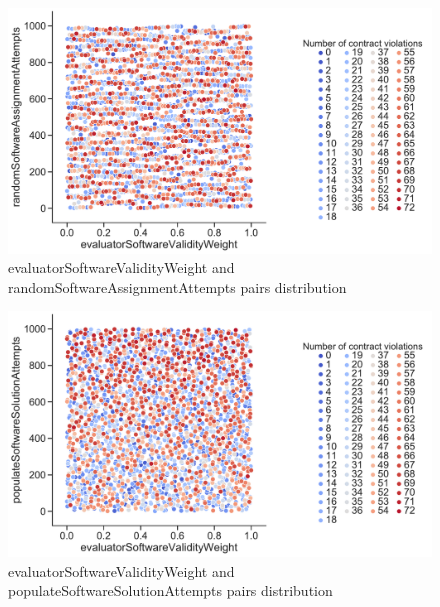\begin{figure}
	\centering
	\includegraphics[width=\textwidth]{images/PairsDistr/evaluatorSoftwareValidityWeight_randomSoftwareAssignmentAttempts.pdf}
	\caption[evaluatorSoftwareValidityWeight and randomSoftwareAssignmentAttempts pairs distribution]{evaluatorSoftwareValidityWeight and randomSoftwareAssignmentAttempts pairs distribution}   
	\label{fig:evaluatorSoftwareValidityWeight_randomSoftwareAssignmentAttempts_pair}
\end{figure}
\clearpage
\begin{figure}
	\centering
	\includegraphics[width=\textwidth]{images/PairsDistr/evaluatorSoftwareValidityWeight_populateSoftwareSolutionAttempts.pdf}
	\caption[evaluatorSoftwareValidityWeight and populateSoftwareSolutionAttempts pairs distribution]{evaluatorSoftwareValidityWeight and populateSoftwareSolutionAttempts pairs distribution}   
	\label{fig:evaluatorSoftwareValidityWeight_populateSoftwareSolutionAttempts_pair}
\end{figure}
\clearpage
